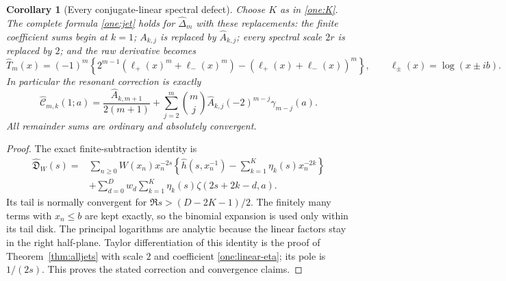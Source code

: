 \documentclass[11pt,a4paper]{article}
\numberwithin{equation}{section}
\theoremstyle{plain}
\newtheorem{corollary}[theorem]{Corollary}
\theoremstyle{definition}
\theoremstyle{remark}
\begin{document}
\begin{corollary}[Every conjugate-linear spectral defect]
\label{cor:linear-jets}
Choose $K$ as in \eqref{one:K}.  The complete formula
\eqref{one:jet} holds for $\widehat\Delta_m$ with these replacements:
the finite coefficient sums begin at $k=1$; $A_{k,j}$ is replaced by
$\widehat A_{k,j}$; every spectral scale $2r$ is replaced by $2$;
and the raw derivative becomes
\begin{equation}\label{one:linear-T}
 \widehat T_m(x)=(-1)^m\left\{
   2^{m-1}(\ell_+(x)^m+\ell_-(x)^m)
                    -(\ell_+(x)+\ell_-(x))^m\right\},\qquad
 \ell_\pm(x)=\log(x\pm ib).
\end{equation}
In particular the resonant correction is exactly
\begin{equation}\label{one:linear-contact}
 \widehat{\mathcal C}_{m,k}(1;a)
 =\frac{\widehat A_{k,m+1}}{2(m+1)}
    +\sum_{j=2}^m\binom mj\widehat A_{k,j}(-2)^{m-j}
                                      \gamma_{m-j}(a).
\end{equation}
All remainder sums are ordinary and absolutely convergent.
\end{corollary}
\begin{proof}
The exact finite-subtraction identity is
\begin{align*}
 \widehat{\mathfrak D}_W(s)
 ={}&\sum_{n\ge0}W(x_n)x_n^{-2s}
       \left\{\widehat h(s,x_n^{-1})-
                         \sum_{k=1}^K\eta_k(s)x_n^{-2k}\right\}\\
 &+\sum_{d=0}^D w_d\sum_{k=1}^K
                            \eta_k(s)\zeta(2s+2k-d,a).
\end{align*}
Its tail is normally convergent for $\Re s>(D-2K-1)/2$.
The finitely many terms with $x_n\le b$ are kept exactly, so the
binomial expansion is used only within its tail disk.  The principal
logarithms are analytic because the linear factors stay in the right
half-plane.  Taylor differentiation of this identity is the proof of
Theorem~\ref{thm:alljets} with scale $2$ and coefficient
\eqref{one:linear-eta}; its pole is $1/(2s)$.
This proves the stated correction and convergence claims.
\end{proof}
\end{document}
